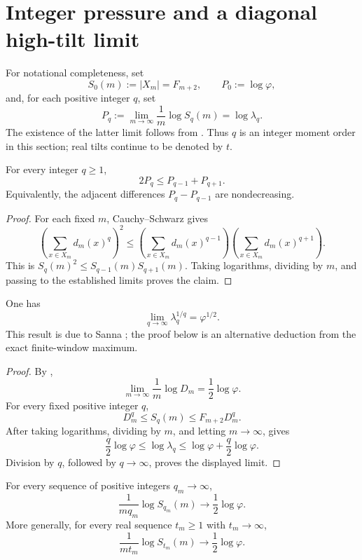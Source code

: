 \section{Integer pressure and a diagonal high-tilt limit}
\label{sec:integer-pressure}

For notational completeness, set
\[
 S_0(m):=|X_m|=F_{m+2},\qquad
 P_0:=\log\varphi,
\]
and, for each positive integer \(q\), set
\[
 P_q:=\lim_{m\to\infty}\frac1m\log S_q(m)=\log\lambda_q.
\]
The existence of the latter limit follows from
.  Thus \(q\) is an integer moment order in this
section; real tilts continue to be denoted by \(t\).

\begin{proposition}
\label{prop:integer-pressure-convexity}
For every integer \(q\ge1\),
\[
  2P_q\le P_{q-1}+P_{q+1}.
\]
Equivalently, the adjacent differences \(P_q-P_{q-1}\) are nondecreasing.
\end{proposition}

\begin{proof}
For each fixed \(m\), Cauchy--Schwarz gives
\[
 \left(\sum_{x\in X_m}d_m(x)^q\right)^2
 \le
 \left(\sum_{x\in X_m}d_m(x)^{q-1}\right)
 \left(\sum_{x\in X_m}d_m(x)^{q+1}\right).
\]
This is \(S_q(m)^2\le S_{q-1}(m)S_{q+1}(m)\).  Taking logarithms,
dividing by \(m\), and passing to the established limits proves the claim.
\end{proof}

\begin{corollary}
\label{cor:renyi-endpoint}
One has
\[
  \lim_{q\to\infty}\lambda_q^{1/q}=\varphi^{1/2}.
\]
This result is due to Sanna \cite[Thm.~1.2]{Sanna2025}; the proof below is an
alternative deduction from the exact finite-window maximum.
\end{corollary}

\begin{proof}
By ,
\[
 \lim_{m\to\infty}\frac1m\log D_m=\frac12\log\varphi.
\]
For every fixed positive integer \(q\),
\[
 D_m^q\le S_q(m)\le F_{m+2}D_m^q.
\]
After taking logarithms, dividing by \(m\), and letting \(m\to\infty\),
 gives
\[
 \frac q2\log\varphi
 \le \log\lambda_q
 \le \log\varphi+\frac q2\log\varphi.
\]
Division by \(q\), followed by \(q\to\infty\), proves the displayed limit.
\end{proof}

\begin{theorem}
\label{thm:diagonal-high-moments}
For every sequence of positive integers \(q_m\to\infty\),
\[
 \frac{1}{m q_m}\log S_{q_m}(m)
 \longrightarrow\frac12\log\varphi.
\]
More generally, for every real sequence \(t_m\ge1\) with
\(t_m\to\infty\),
\[
 \frac{1}{m t_m}\log S_{t_m}(m)
 \longrightarrow\frac12\log\varphi.
\]
\end{theorem}

